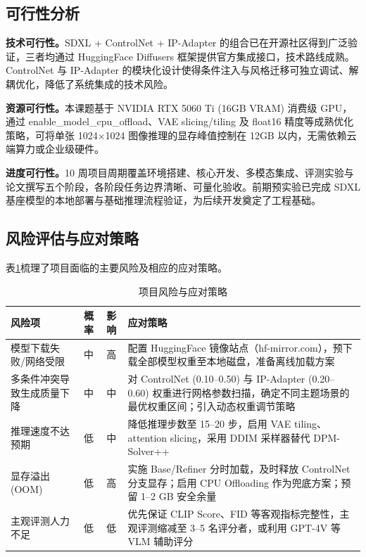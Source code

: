 \documentclass[10pt,a4paper]{article}
\begin{document}
\subsection{可行性分析}

\textbf{技术可行性。}SDXL + ControlNet + IP-Adapter 的组合已在开源社区得到广泛验证，三者均通过 HuggingFace Diffusers 框架提供官方集成接口，技术路线成熟。ControlNet 与 IP-Adapter 的模块化设计使得条件注入与风格迁移可独立调试、解耦优化，降低了系统集成的技术风险。

\textbf{资源可行性。}本课题基于 NVIDIA RTX 5060 Ti (16GB VRAM) 消费级 GPU，通过 enable\_model\_cpu\_offload、VAE slicing/tiling 及 float16 精度等成熟优化策略，可将单张 1024×1024 图像推理的显存峰值控制在 12GB 以内，无需依赖云端算力或企业级硬件。

\textbf{进度可行性。}10 周项目周期覆盖环境搭建、核心开发、多模态集成、评测实验与论文撰写五个阶段，各阶段任务边界清晰、可量化验收。前期预实验已完成 SDXL 基座模型的本地部署与基础推理流程验证，为后续开发奠定了工程基础。

\subsection{风险评估与应对策略}

表\ref{tab:risk}梳理了项目面临的主要风险及相应的应对策略。

\begin{table}[H]
\centering
\caption{项目风险与应对策略}
\label{tab:risk}
\small
\begin{tabular}{@{}p{2.8cm}cc p{4.8cm}@{}}
\toprule
\textbf{风险项} & \textbf{概率} & \textbf{影响} & \textbf{应对策略} \\
\midrule
模型下载失败/网络受限 & 中 & 高 & 配置 HuggingFace 镜像站点（hf-mirror.com），预下载全部模型权重至本地磁盘，准备离线加载方案 \\
多条件冲突导致生成质量下降 & 中 & 中 & 对 ControlNet (0.10--0.50) 与 IP-Adapter (0.20--0.60) 权重进行网格参数扫描，确定不同主题场景的最优权重区间；引入动态权重调节策略 \\
推理速度不达预期 & 低 & 中 & 降低推理步数至 15--20 步，启用 VAE tiling、attention slicing，采用 DDIM 采样器替代 DPM-Solver++ \\
显存溢出 (OOM) & 低 & 高 & 实施 Base/Refiner 分时加载，及时释放 ControlNet 分支显存；启用 CPU Offloading 作为兜底方案；预留 1--2 GB 安全余量 \\
主观评测人力不足 & 低 & 低 & 优先保证 CLIP Score、FID 等客观指标完整性，主观评测缩减至 3--5 名评分者，或利用 GPT-4V 等 VLM 辅助评分 \\
\bottomrule
\end{tabular}
\end{table}
\end{document}
